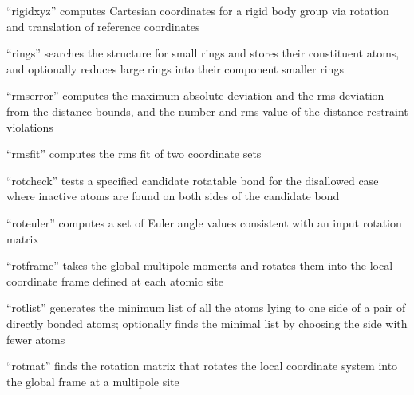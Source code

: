 \documentclass[letterpaper,11pt,english]{sphinxmanual}
\begin{document}
\sphinxAtStartPar
{}

\sphinxAtStartPar
“rigidxyz” computes Cartesian coordinates for a rigid body group via rotation and translation of reference coordinates

\sphinxAtStartPar
{}

\sphinxAtStartPar
“rings” searches the structure for small rings and stores their constituent atoms, and optionally reduces large rings into their component smaller rings

\sphinxAtStartPar
{}

\sphinxAtStartPar
“rmserror” computes the maximum absolute deviation and the rms deviation from the distance bounds, and the number and rms value of the distance restraint violations

\sphinxAtStartPar
{}

\sphinxAtStartPar
“rmsfit” computes the rms fit of two coordinate sets

\sphinxAtStartPar
{}

\sphinxAtStartPar
{}

\sphinxAtStartPar
“rotcheck” tests a specified candidate rotatable bond for the disallowed case where inactive atoms are found on both sides of the candidate bond

\sphinxAtStartPar
{}

\sphinxAtStartPar
“roteuler” computes a set of Euler angle values consistent with an input rotation matrix

\sphinxAtStartPar
{}

\sphinxAtStartPar
“rotframe” takes the global multipole moments and rotates them into the local coordinate frame defined at each atomic site

\sphinxAtStartPar
{}

\sphinxAtStartPar
“rotlist” generates the minimum list of all the atoms lying to one side of a pair of directly bonded atoms; optionally finds the minimal list by choosing the side with fewer atoms

\sphinxAtStartPar
{}

\sphinxAtStartPar
“rotmat” finds the rotation matrix that rotates the local coordinate system into the global frame at a multipole site
\end{document}
